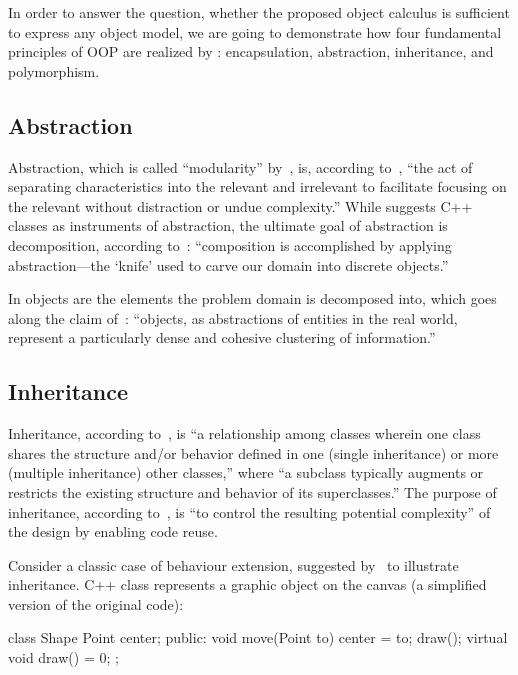 In order to answer the question, whether
the proposed object calculus is sufficient
to express any object model, we are going to demonstrate
how four fundamental principles of OOP are realized by \phic{}:
encapsulation, abstraction, inheritance, and polymorphism.

\subsection{Abstraction}

Abstraction, which is called ``modularity'' by~\citet{grady2007object}, is,
according to~\citet[p.203]{west2004object},
``the act of separating characteristics into the relevant and
irrelevant to facilitate focusing on the relevant without
distraction or undue complexity.'' While \citet{stroustrup1997} suggests
C++ classes as instruments of abstraction, the ultimate goal
of abstraction is decomposition, according to~\citet[p.73]{west2004object}:
``composition is accomplished by applying abstraction---the
`knife' used to carve our domain into discrete objects.''

In \phic{} objects are the elements the problem domain
is decomposed into, which goes along the claim of~\citet[p.24]{west2004object}:
``objects, as abstractions of entities in the real world,
represent a particularly dense and cohesive clustering of information.''

\subsection{Inheritance}

Inheritance, according to~\citet{grady2007object}, is
``a relationship among classes wherein one class shares the structure
and/or behavior defined in one (single inheritance)
or more (multiple inheritance) other classes,'' where
``a subclass typically augments or
restricts the existing structure and behavior of its superclasses.''
The purpose of inheritance, according to~\citet{meyer1997object}, is
``to control the resulting potential complexity'' of the design
by enabling code reuse.

Consider a classic case of behaviour extension, suggested by~\citet[p.38]{stroustrup1997}
to illustrate inheritance. C++ class  represents a graphic object
on the canvas (a simplified version of the original code):

\begin{ffcode}
class Shape {
  Point center;
public:
  void move(Point to) { center = to; draw(); }
  virtual void draw() = 0;
};
\end{ffcode}

